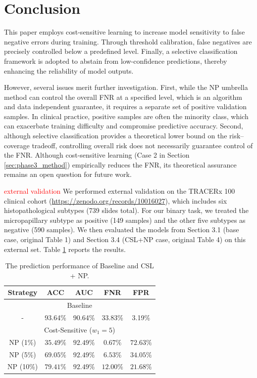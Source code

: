 \documentclass[sigconf,review,anonymous]{acmart}
\theoremstyle{remark}
\begin{document}
\section{Conclusion}

This paper employs cost-sensitive learning to increase model sensitivity to false negative errors during training. Through threshold calibration, false negatives are precisely controlled below a predefined level. Finally, a selective classification framework is adopted to abstain from low-confidence predictions, thereby enhancing the reliability of model outputs.

However, several issues merit further investigation. First, while the NP umbrella method can control the overall FNR at a specified level, which is an algorithm and data independent guarantee, it requires a separate set of positive validation samples. In clinical practice, positive samples are often the minority class, which can exacerbate training difficulty and compromise predictive accuracy. Second, although selective classification provides a theoretical lower bound on the risk–coverage tradeoff, controlling overall risk does not necessarily guarantee control of the FNR. Although cost-sensitive learning (Case 2 in Section \ref{sec:phase3_method}) empirically reduces the FNR, its theoretical assurance remains an open question for future work.

\textcolor{red}{external validation}
We performed external validation on the TRACERx 100 clinical cohort (\url{https://zenodo.org/records/10016027}), which includes six histopathological subtypes (739 slides total). For our binary task, we treated the micropapillary subtype as positive (149 samples) and the other five subtypes as negative (590 samples). We then evaluated the models from Section 3.1 (base case, original Table 1) and Section 3.4 (CSL+NP case, original Table 4) on this external set. Table \ref{tab1} reports the results.

\begin{table}[htbp]
    \centering
    \caption{The prediction performance of Baseline and CSL + NP.}
    \label{tab1}
    \renewcommand\arraystretch{1.2} 
    \begin{tabular}{ccccc}
        \toprule
        Strategy & ACC & AUC & FNR & FPR \\
        \midrule
        \multicolumn{5}{c}{Baseline} \\
        \midrule
        - & 93.64\% & 90.64\% & 33.83\% & 3.19\% \\
        \midrule
        \multicolumn{5}{c}{Cost-Sensitive ($w_{1}=5$)} \\
        \midrule
        NP (1\%) & $35.49\%$ & $92.49\%$ & $0.67\%$ & $72.63\%$ \\
        NP (5\%) & $69.05\%$ & $92.49\%$ & $6.53\%$ & $34.05\%$ \\
        NP (10\%) & $79.41\%$ & $92.49\%$ & $12.00\%$ & $21.68\%$ \\
        \bottomrule
    \end{tabular}
    
\end{table}
\end{document}

